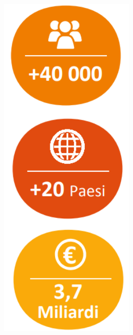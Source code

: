 

\begin{figure}[htbp]
\centering
\begin{minipage}[c]{.40\textwidth}
\centering\setlength{\captionmargin}{0pt}%
\includegraphics[width=0.6\textwidth]{immagini/dipendenti_paesi_fatturato_mondo}

\end{minipage}
\end{figure}
